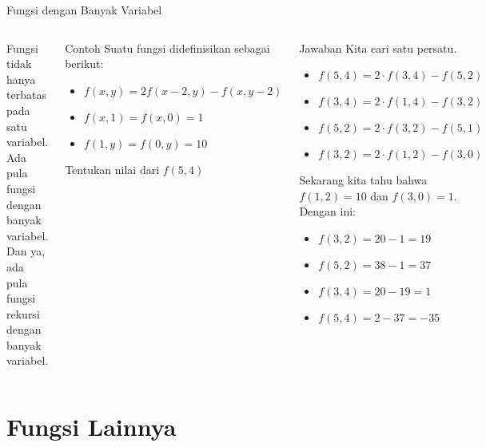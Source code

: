 \documentclass[10pt,aspectratio=54, handout]{beamer}
\begin{document}
  \begin{frame}{Fungsi dengan Banyak Variabel}
  \begin{columns}[c]
    Fungsi tidak hanya terbatas pada satu variabel. Ada pula fungsi dengan banyak variabel. Dan ya, ada pula fungsi rekursi dengan banyak variabel. 
    
    \begin{exampleblock}{Contoh}
      Suatu fungsi didefinisikan sebagai berikut:
      \begin{itemize}
        \item $f(x,y) = 2f(x-2,y) - f(x,y-2)$
        \item $f(x,1) = f(x,0) = 1$
        \item $f(1,y) = f(0,y) = 10$
      \end{itemize}
      Tentukan nilai dari $f(5,4)$
    \end{exampleblock}
    
    
    \begin{block}{Jawaban}
      Kita cari satu persatu.
      \begin{itemize}
        \item $f(5,4) = 2\cdot f(3,4) - f(5,2)$
        \item $f(3,4) = 2\cdot f(1,4) - f(3,2)$
        \item $f(5,2) = 2\cdot f(3,2) - f(5,1)$
        \item $f(3,2) = 2\cdot f(1,2) - f(3,0)$
      \end{itemize}
      Sekarang kita tahu bahwa $f(1,2)=10$ dan $f(3,0)=1$. Dengan ini:
      \begin{itemize}
        \item $f(3,2) = 20 - 1 = 19$
        \item $f(5,2) = 38 - 1 = 37$
        \item $f(3,4) = 20 - 19 = 1$
        \item $f(5,4) = 2 - 37 = \boxed{-35}$
      \end{itemize}
    \end{block}
    
    
  \end{columns}
  \end{frame}
  
  \section{Fungsi Lainnya}
  \label{sec:Fungsi Lainnya}
  
\end{document}
